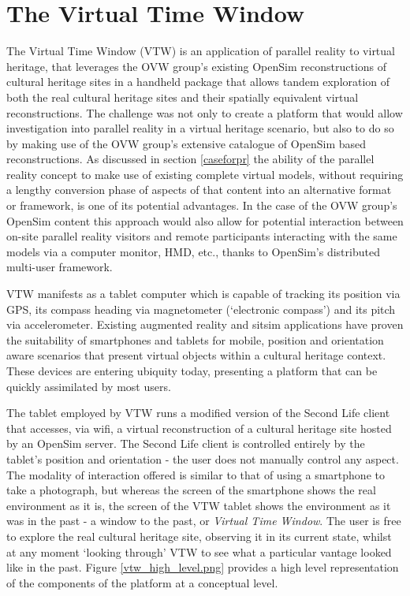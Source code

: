 \section{The Virtual Time Window}
\label{the-virtual-time-window}
The Virtual Time Window (VTW) is an application of parallel reality to virtual heritage, that leverages the OVW group's existing OpenSim reconstructions of cultural heritage sites in a handheld package that allows tandem exploration of both the real cultural heritage sites and their spatially equivalent virtual reconstructions. The challenge was not only to create a platform that would allow investigation into parallel reality in a virtual heritage scenario, but also to do so by making use of the OVW group's extensive catalogue of OpenSim based reconstructions. As discussed in section \ref{caseforpr} the ability of the parallel reality concept to make use of existing complete virtual models, without requiring a lengthy conversion phase of aspects of that content into an alternative format or framework, is one of its potential advantages. In the case of the OVW group's OpenSim content this approach would also allow for potential interaction between on-site parallel reality visitors and remote participants interacting with the same models via a computer monitor, HMD, etc., thanks to OpenSim's distributed multi-user framework.

VTW manifests as a tablet computer which is capable of tracking its position via GPS, its compass heading via magnetometer (`electronic compass') and its pitch via accelerometer. Existing augmented reality and sitsim applications have proven the suitability of smartphones and tablets for mobile, position and orientation aware scenarios that present virtual objects within a cultural heritage context. These devices are entering ubiquity today, presenting a platform that can be quickly assimilated by most users.

The tablet employed by VTW runs a modified version of the Second Life client that accesses, via wifi, a virtual reconstruction of a cultural heritage site hosted by an OpenSim server. The Second Life client is controlled entirely by the tablet's position and orientation - the user does not manually control any aspect. The modality of interaction offered is similar to that of using a smartphone to take a photograph, but whereas the screen of the smartphone shows the real environment as it is, the screen of the VTW tablet shows the environment as it was in the past - a window to the past, or \textit{Virtual Time Window}. The user is free to explore the real cultural heritage site, observing it in its current state, whilst at any moment `looking through' VTW to see what a particular vantage looked like in the past. Figure \ref{vtw_high_level.png} provides a high level representation of the components of the platform at a conceptual level.

